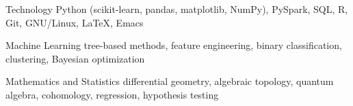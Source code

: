 

\begin{cvskills}

  \cvskill
    {Technology} %
    {Python (scikit-learn, pandas, matplotlib, NumPy), PySpark, SQL, R, Git, GNU/Linux, LaTeX, Emacs} %

  \cvskill
    {Machine Learning} %
    {tree-based methods, feature engineering, binary classification, clustering, Bayesian optimization} %

  \cvskill
    {Mathematics and Statistics} %
    {differential geometry, algebraic topology, quantum algebra, cohomology, regression, hypothesis testing} %

\end{cvskills}

